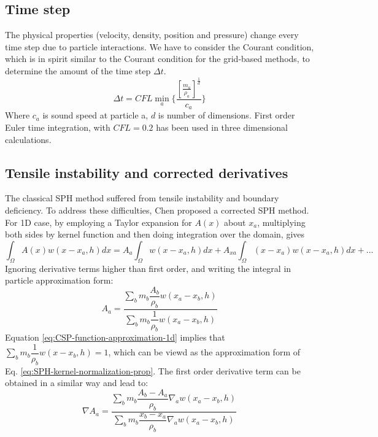 \documentclass[journal abbreviation, manuscript]{copernicus}
\begin{document}
\subsection{Time step}
The physical properties (velocity, density, position and pressure) change every time step due to particle interactions. We have to consider the Courant condition, which is in spirit similar to the Courant condition for the grid-based methods, to determine the amount of the time step $\Delta t$.
\begin{equation}
\Delta t = CFL \min_a \bigg \lbrace \dfrac{[\frac{m_a}{\rho_a}]^{\frac{1}{d}}}{c_a} \bigg \rbrace
\end{equation}
Where $c_a$ is sound speed at particle a, $d$ is number of dimensions. First order Euler time integration, with $CFL = 0.2$ has been used in three dimensional calculations.

\subsection{Tensile instability and corrected derivatives}
The classical SPH method suffered from tensile instability and boundary deficiency. To address these difficulties, Chen \citep{chen1999improvement} proposed a corrected SPH method. For 1D case, by employing a Taylor expansion for $A(x)$ about $x_a$, multiplying both sides by kernel function and then doing integration over the domain, gives
\begin{equation}
\int_{\Omega} A(x) w(x- x_a, h) dx = 
A_a \int_{\Omega} w(x - x_a, h) dx +A_{xa} \int_{\Omega} (x-x_a) w(x - x_a, h) dx +...
\end{equation}
Ignoring derivative terms higher than first order, and writing the integral in particle approximation form:
\begin{equation}
A_a = \frac{\sum_b m_b \dfrac{A_b}{\rho_b} w(x_a-x_b, h)}{\sum_b m_b \dfrac{1}{\rho_b} w(x_a-x_b, h)}
\label{eq:CSP-function-approximation-1d}
\end{equation}
Equation \ref{eq:CSP-function-approximation-1d} implies that $\sum_b m_b \dfrac{1}{\rho_b} w(x-x_b, h) = 1$, which can be viewd as the approximation form of Eq. \ref{eq:SPH-kernel-normalization-prop}. The first order derivative term can be obtained in a similar way and lead to:
\begin{equation}
\nabla A_a = \frac{\sum_b m_b \dfrac{A_b - A_a}{\rho_b} \nabla_a w(x_a-x_b, h)}{\sum_b m_b \dfrac{x_b - x_a}{\rho_b} \nabla_a w(x_a-x_b, h)}
\end{equation}
\end{document}
